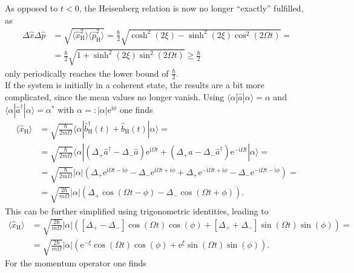 \documentclass[english, parskip=full]{scrartcl}
\newcommand{\bra}{}
\newcommand{\braket}{}
\newcommand{\kla}{}
\newcommand{\klam}{}
\newcommand{\tecxt}{}
\renewcommand{\i}{\text{i}}
\newcommand{\e}{\text{e}}
\begin{document}
As opposed to $t<0$, the Heisenberg relation is now no longer ``exactly'' fulfilled, as
\begin{align}
\Delta\hat{x}\Delta\hat{p} &= \sqrt{\bra\langle \hat{x}_\tecxt\text{H}^2 \rangle\bra\langle \hat{p}_\tecxt\text{H}^2 \rangle} = \frac{\hbar}{2}\sqrt{\cosh^2(2\xi) - \sinh^2(2\xi)\cos^2(2\Omega t)} = \\
&=\frac{\hbar}{2}\sqrt{1 + \sinh^2(2\xi)\sin^2(2\Omega t)} \ge \frac{\hbar}{2}
\end{align}
only periodically reaches the lower bound of $\frac{\hbar}{2}$.\\
If the system is initially in a coherent state, the results are a bit more complicated, since the mean values no longer vanish.
Using $\braket\langle \alpha | \hat{a} | \alpha \rangle = \alpha$ and $\braket\langle \alpha | \hat{a}^\dagger | \alpha \rangle = \alpha^\ast$ with $\alpha =: |\alpha|\e^{\i\phi}$ one finds
\begin{align}
\bra\langle \hat{x}_\tecxt\text{H} \rangle &= \sqrt{\frac{\hbar}{2m\Omega}}\braket\langle \alpha | \hat{b}_\tecxt\text{H}^\dagger(t) + \hat{b}_\tecxt\text{H}(t) | \alpha \rangle =\\
&= \sqrt{\frac{\hbar}{2m\Omega}}\braket\langle \alpha | \kla\left( \Delta_+\hat{a}^\dagger - \Delta_-\hat{a} \right)\e^{\i\Omega t} + \kla\left( \Delta_+\hat{a} - \Delta_-\hat{a}^\dagger \right)\e^{-\i\Omega t} | \alpha \rangle = \\
&=\sqrt{\frac{\hbar}{2m\Omega}}|\alpha|\kla\left( \Delta_+\e^{\i\Omega t - \i\phi} - \Delta_-\e^{\i\Omega t + \i\phi} + \Delta_+ \e^{-\i\Omega t + \i\phi} - \Delta_-\e^{-\i\Omega t - \i\phi} \right) = \\
&=\sqrt{\frac{2\hbar}{m\Omega}}|\alpha|\kla\left( \Delta_+\cos\kla\left( \Omega t-\phi \right) - \Delta_-\cos\kla\left( \Omega t + \phi \right) \right).
\end{align}
This can be further simplified using trigonometric identities, leading to
\begin{align}
\bra\langle \hat{x}_\tecxt\text{H} \rangle &= \sqrt{\frac{2\hbar}{m\Omega}}|\alpha| \kla\left( \klam\left[ \Delta_+ - \Delta_- \right]\cos (\Omega t)\cos(\phi) + \klam\left[ \Delta_+ + \Delta_- \right]\sin (\Omega t)\sin(\phi) \right) = \\
&=\sqrt{\frac{2\hbar}{m\Omega}}|\alpha| \kla\left( \e^{-\xi}\cos (\Omega t)\cos(\phi) + \e^\xi\sin (\Omega t)\sin(\phi) \right).
\end{align}
For the momentum operator one finds
\end{document}
